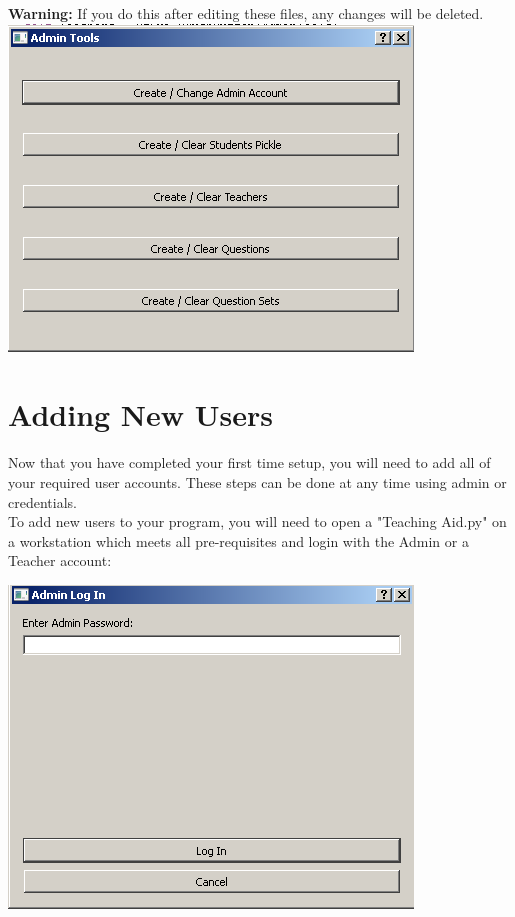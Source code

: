 \documentclass{report}
\begin{document}
\textbf{Warning: }If you do this after editing these files, any changes will be deleted.\\
\includegraphics{AdminTools}\\
\chapter{Adding New Users}
Now that you have completed your first time setup, you will need to add all of your required user accounts. These steps can be done at any time using admin or credentials.\\
To add new users to your program, you will need to open a "Teaching Aid.py" on a workstation which meets all pre-requisites and login with the Admin or a Teacher account:\\

\bigskip

\includegraphics{adminlogin}\\
\bigskip
\end{document}
